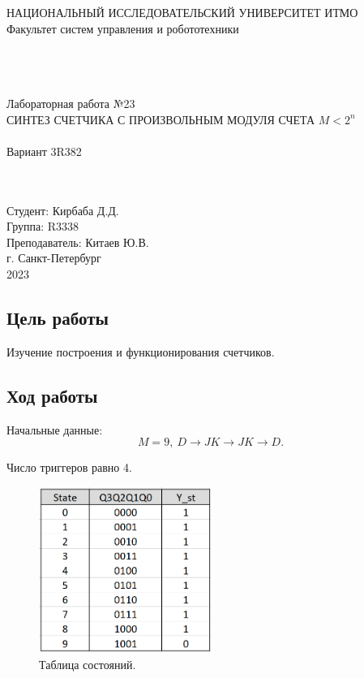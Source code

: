 \documentclass[12pt]{article}
\begin{document}
\begin{titlepage}
\begin{center}
    НАЦИОНАЛЬНЫЙ ИССЛЕДОВАТЕЛЬСКИЙ УНИВЕРСИТЕТ ИТМО \\
    Факультет систем управления и робототехники \\
    \vspace*{10\baselineskip}
    {} \\
    \ \\
    \ \\
    \begin{spacing}{1.5}
    {\large Лабораторная работа №23 \\
    СИНТЕЗ СЧЕТЧИКА С ПРОИЗВОЛЬНЫМ МОДУЛЯ СЧЕТА $M < 2^n$ \\
    \ \\
    Вариант 3R382}
    \end{spacing} \\
    \ \\
    \vspace*{10\baselineskip}
    \hfill {Студент: Кирбаба Д.Д.\ \ \ \ \ \ \ \ \ } \\
    \hfill {Группа: R3338\ \ \ \ \ \ \ \ \ \ \ \ \ \ \ \ \ \ \ \ \ } \\
    \hfill {Преподаватель: Китаев Ю.В.} \\
    \mbox{}
    \vfill {г. Санкт-Петербург\\2023}
\end{center}
\end{titlepage}

\subsection*{Цель работы}
Изучение построения и функционирования счетчиков.

\subsection*{Ход работы}

Начальные данные:
\[
    M = 9, \ D \rightarrow JK \rightarrow JK \rightarrow D.
\]

Число триггеров равно 4. \\

\begin{figure}[H]
    \centering
    \includegraphics[width=0.5\textwidth]{states.png}
    \caption{Таблица состояний.}
    \label{fig:states}
\end{figure}
\end{document}
